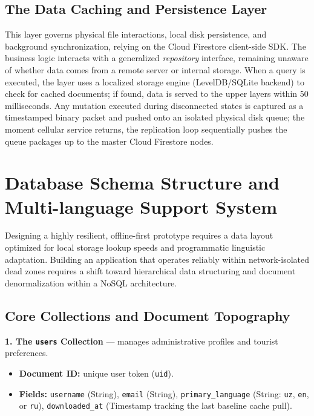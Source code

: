 \documentclass[12pt,a4paper,oneside]{report}
\begin{document}
\subsection{The Data Caching and Persistence Layer}

This layer governs physical file interactions, local disk persistence, and background
synchronization, relying on the Cloud Firestore client-side SDK. The business logic
interacts with a generalized \emph{repository} interface, remaining unaware of whether
data comes from a remote server or internal storage. When a query is executed, the layer
uses a localized storage engine (LevelDB/SQLite backend) to check for cached documents; if
found, data is served to the upper layers within 50 milliseconds. Any mutation executed
during disconnected states is captured as a timestamped binary packet and pushed onto an
isolated physical disk queue; the moment cellular service returns, the replication loop
sequentially pushes the queue packages up to the master Cloud Firestore nodes.

\section{Database Schema Structure and Multi-language Support System}

Designing a highly resilient, offline-first prototype requires a data layout optimized for
local storage lookup speeds and programmatic linguistic adaptation. Building an application
that operates reliably within network-isolated dead zones requires a shift toward
hierarchical data structuring and document denormalization within a NoSQL architecture.

\subsection{Core Collections and Document Topography}

\textbf{1. The \texttt{users} Collection} --- manages administrative profiles and tourist
preferences.
\begin{itemize}[leftmargin=1.4em]
  \item \textbf{Document ID:} unique user token (\texttt{uid}).
  \item \textbf{Fields:} \texttt{username} (String), \texttt{email} (String),
        \texttt{primary\_language} (String: \texttt{uz}, \texttt{en}, or \texttt{ru}),
        \texttt{downloaded\_at} (Timestamp tracking the last baseline cache pull).
\end{itemize}
\end{document}
